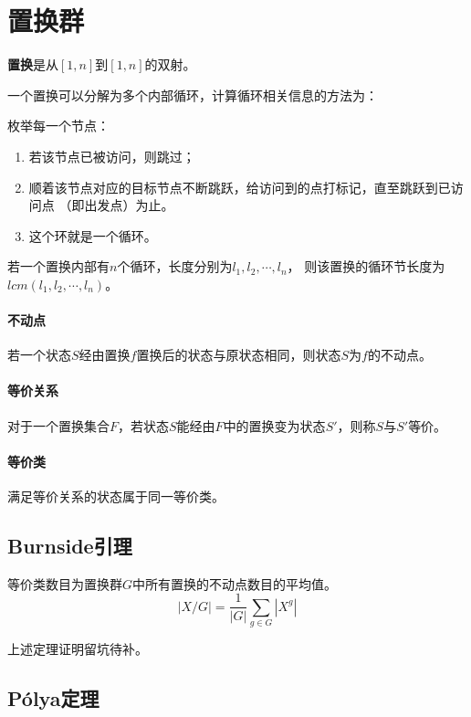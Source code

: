 \section{置换群}
{\bfseries 置换}是从$[1,n]$到$[1,n]$的双射。

一个置换可以分解为多个内部循环，计算循环相关信息的方法为：

枚举每一个节点：
\begin{enumerate}
	\item 若该节点已被访问，则跳过；
	\item 顺着该节点对应的目标节点不断跳跃，给访问到的点打标记，直至跳跃到已访问点
	      （即出发点）为止。
	\item 这个环就是一个循环。
\end{enumerate}
\begin{theorem}
	若一个置换内部有$n$个循环，长度分别为$l_1,l_2,\cdots,l_n$，
	则该置换的循环节长度为$lcm(l_1,l_2,\cdots,l_n)$。
\end{theorem}
\paragraph{不动点}
若一个状态$S$经由置换$f$置换后的状态与原状态相同，则状态$S$为$f$的不动点。
\paragraph{等价关系}
对于一个置换集合$F$，若状态$S$能经由$F$中的置换变为状态$S'$，则称$S$与$S'$等价。
\paragraph{等价类}
满足等价关系的状态属于同一等价类。

\subsection{Burnside引理}
\begin{lemma}\label{burnside}
	等价类数目为置换群$G$中所有置换的不动点数目的平均值。
	\begin{displaymath}
		|X/G|=\frac{1}{|G|}\sum_{g\in G}|X^g|
	\end{displaymath}
\end{lemma}
上述定理证明留坑待补。
\subsection{Pólya定理}

